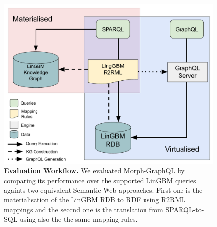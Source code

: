 \begin{figure}[ht]
    \centering
    \includegraphics[width=.8\linewidth]{figures/evaluation.pdf}
    \caption[Morph-GraphQL evaluation workflow.]{\textbf{Evaluation Workflow.} We evaluated Morph-GraphQL by comparing its performance over the supported LinGBM queries againts two equivalent Semantic Web approaches. First one is the materialisation of the LinGBM RDB to RDF using R2RML mappings and the second one is the translation from SPARQL-to-SQL using also the the same mapping rules.}
    \label{fig:eval-workflow}
\end{figure}

